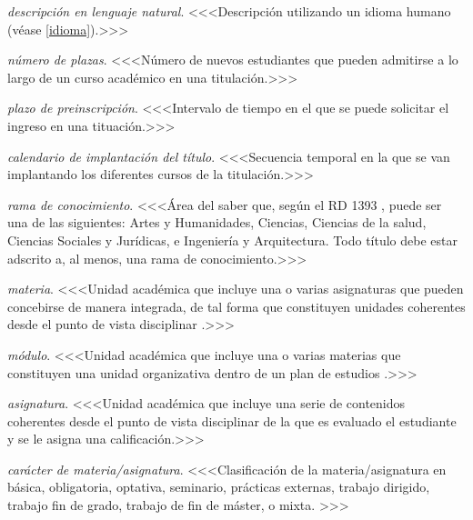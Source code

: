     \item \emph{descripción en lenguaje natural}. <<<Descripción utilizando un idioma humano (véase \ref{idioma}).>>>

    \item \emph{número de plazas}. <<<Número de nuevos estudiantes que pueden admitirse a lo largo de un curso académico en una titulación.>>>

    \item \emph{plazo de preinscripción}. <<<Intervalo de tiempo en el que se puede solicitar el ingreso en una tituación.>>>

    \item \emph{calendario de implantación del título}. <<<Secuencia temporal en la que se van implantando los diferentes cursos de la titulación\cite[página 62]{guiaAneca}.>>>

    \item \emph{rama de conocimiento}. <<<Área del saber que, según el RD 1393 \cite[artículo 12, apartado 4]{rd1393}, puede ser una de las siguientes: Artes y Humanidades, Ciencias, Ciencias de la salud, Ciencias Sociales y Jurídicas, e Ingeniería y Arquitectura. Todo título debe estar adscrito a, al menos, una rama de conocimiento.>>>

    \item \emph{materia}. <<<Unidad académica que incluye una o varias asignaturas que pueden concebirse de manera integrada, de tal forma que constituyen unidades coherentes desde el punto de vista disciplinar \cite[página 33]{guiaAneca}.>>>

    \item \emph{módulo}. <<<Unidad académica que incluye una o varias materias que constituyen una unidad organizativa dentro de un plan de estudios \cite[página 33]{guiaAneca}.>>>

    \item \emph{asignatura}. <<<Unidad académica que incluye una serie de contenidos coherentes desde el punto de vista disciplinar de la que es evaluado el estudiante y se le asigna una calificación.>>>

    \item \emph{carácter de materia/asignatura}. <<<Clasificación de la materia/asignatura en básica, obligatoria, optativa, seminario, prácticas externas, trabajo dirigido, trabajo fin de grado, trabajo de fin de máster, o mixta.\cite[artículo 12, apartado 2]{rd1393} \cite[sección D.5]{guiaMadridMasD}>>>

